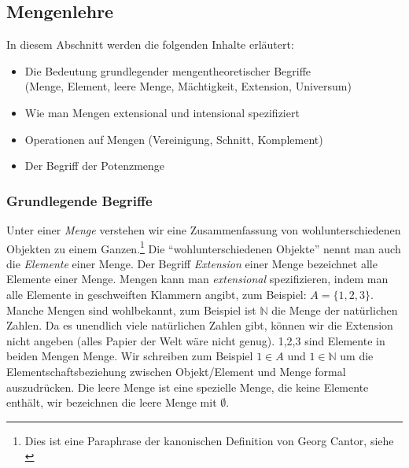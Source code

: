 \subsection{Mengenlehre}\label{mengenlehre}
In diesem Abschnitt werden die folgenden Inhalte erläutert:
\begin{itemize}
    \item Die Bedeutung grundlegender mengentheoretischer Begriffe\\
        (Menge, Element, leere Menge, Mächtigkeit, Extension, Universum)
    \item Wie man Mengen extensional und intensional spezifiziert
    \item Operationen auf Mengen (Vereinigung, Schnitt, Komplement)
    \item Der Begriff der Potenzmenge
\end{itemize}
\subsubsection{Grundlegende Begriffe}\label{grundmenge}
Unter einer \emph{Menge} verstehen wir eine Zusammenfassung von wohlunterschiedenen Objekten
zu einem Ganzen.\footnote{
    Dies ist eine Paraphrase der kanonischen Definition von Georg Cantor, siehe \cite{cantor}
}
Die ``wohlunterschiedenen Objekte'' nennt man auch die \emph{Elemente} einer Menge.
Der Begriff \emph{Extension} einer Menge bezeichnet alle Elemente einer Menge.
Mengen kann man \emph{extensional} spezifizieren,
indem man alle Elemente in geschweiften Klammern angibt,
zum Beispiel: $A = \{ 1,2,3 \}$.
Manche Mengen sind wohlbekannt,
zum Beispiel ist $\mathbb{N}$ die Menge der natürlichen Zahlen.
Da es unendlich viele natürlichen Zahlen gibt,
können wir die Extension nicht angeben
(alles Papier der Welt wäre nicht genug).
1,2,3 sind Elemente in beiden Mengen Menge.
Wir schreiben zum Beispiel $1 \in A$ und $1 \in \mathbb{N}$
um die Elementschaftsbeziehung zwischen Objekt/Element und Menge formal auszudrücken.
Die leere Menge ist eine spezielle Menge, die keine Elemente enthält,
wir bezeichnen die leere Menge mit $\emptyset$.

